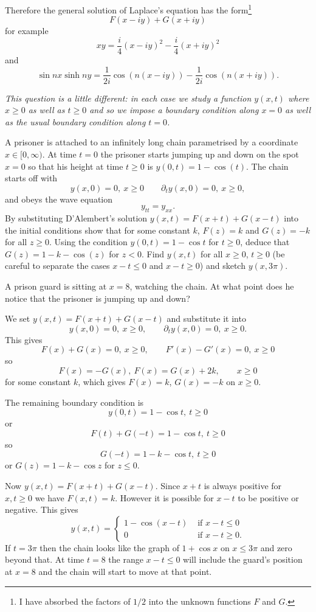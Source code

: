 \documentclass[12pt]{article}
\begin{document}
\begin{answer}
Therefore the general solution of Laplace's equation has the form\footnote{I have absorbed the factors of $1/2$ into the unknown functions $F$ and $G$.}
\[F(x-iy)+G(x+iy)\]
for example
\[xy=\frac{i}{4}(x-iy)^2-\frac{i}{4}(x+iy)^2\]
and
\[\sin nx\sinh ny=\frac{1}{2i}\cos(n(x-iy))-\frac{1}{2i}\cos(n(x+iy)).\]
\end{answer}
\newpage

\bigskip

\begin{question}
 {\em This question is a little different: in each case we study a function $y(x,t)$ where $x\geq 0$ as well as $t\geq 0$ and so we impose a boundary condition along $x=0$ as well as the usual boundary condition along $t=0$.}

A prisoner is attached to an infinitely long chain parametrised by a coordinate $x\in[0,\infty)$. At time $t=0$ the prisoner starts jumping up and down on the spot $x=0$ so that his height at time $t\geq 0$ is $y(0,t)=1-\cos(t)$. The chain starts off with
\[y(x,0)=0,\ x\geq 0\qquad\partial_ty(x,0)=0,\ x\geq 0,\]
and obeys the wave equation
\[y_{tt}=y_{xx}.\]
By substituting D'Alembert's solution $y(x,t)=F(x+t)+G(x-t)$ into the initial conditions show that for some constant $k$, $F(z)=k$ and $G(z)=-k$ for all $z\geq 0$. Using the condition $y(0,t)=1-\cos t$ for $t\geq 0$, deduce that $G(z)=1-k-\cos(z)$ for $z<0$. Find $y(x,t)$ for all $x\geq 0$, $t\geq 0$ (be careful to separate the cases $x-t\leq 0$ and $x-t\geq 0$) and sketch $y(x,3\pi)$.

A prison guard is sitting at $x=8$, watching the chain. At what point does he notice that the prisoner is jumping up and down?
\end{question}

\begin{answer}
We set $y(x,t)=F(x+t)+G(x-t)$ and substitute it into
\[y(x,0)=0,\ x\geq 0,\qquad\partial_ty(x,0)=0,\ x\geq 0.\]
This gives
\[F(x)+G(x)=0,\ x\geq 0,\qquad F'(x)-G'(x)=0,\ x\geq 0\]
so
\[F(x)=-G(x),\ F(x)=G(x)+2k,\qquad x\geq 0\]
for some constant $k$, which gives $F(x)=k$, $G(x)=-k$ on $x\geq 0$.

The remaining boundary condition is
\[y(0,t)=1-\cos t,\ t\geq 0\]
or
\[F(t)+G(-t)=1-\cos t,\ t\geq 0\]
so
\[G(-t)=1-k-\cos t,\ t\geq 0\]
or $G(z)=1-k-\cos z$ for $z\leq 0$.

Now $y(x,t)=F(x+t)+G(x-t)$. Since $x+t$ is always positive for $x,t\geq 0$ we have $F(x,t)=k$. However it is possible for $x-t$ to be positive or negative. This gives
\[y(x,t)=\begin{cases}
1-\cos(x-t)&\mbox{ if }x-t\leq 0\\
0&\mbox{ if }x-t\geq 0.
\end{cases}\]
If $t=3\pi$ then the chain looks like the graph of $1+\cos x$ on $x\leq 3\pi$ and zero beyond that. At time $t=8$ the range $x-t\leq 0$ will include the guard's position at $x=8$ and the chain will start to move at that point.
\end{answer}
\end{document}
